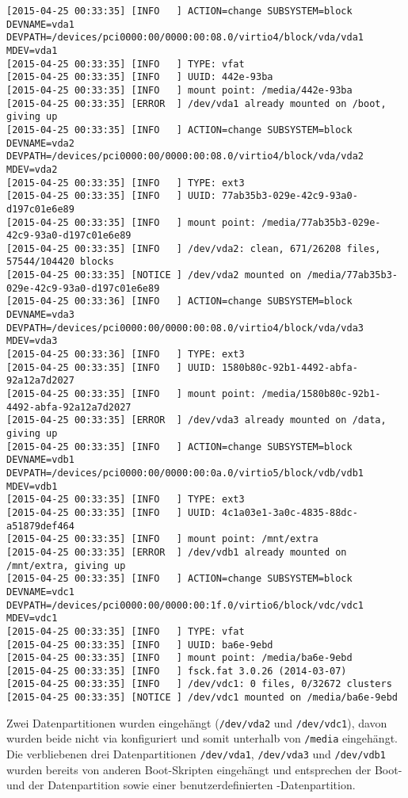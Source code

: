\begin{tiny}
\begin{verbatim}
[2015-04-25 00:33:35] [INFO   ] ACTION=change SUBSYSTEM=block DEVNAME=vda1 DEVPATH=/devices/pci0000:00/0000:00:08.0/virtio4/block/vda/vda1 MDEV=vda1
[2015-04-25 00:33:35] [INFO   ] TYPE: vfat
[2015-04-25 00:33:35] [INFO   ] UUID: 442e-93ba
[2015-04-25 00:33:35] [INFO   ] mount point: /media/442e-93ba
[2015-04-25 00:33:35] [ERROR  ] /dev/vda1 already mounted on /boot, giving up
[2015-04-25 00:33:35] [INFO   ] ACTION=change SUBSYSTEM=block DEVNAME=vda2 DEVPATH=/devices/pci0000:00/0000:00:08.0/virtio4/block/vda/vda2 MDEV=vda2
[2015-04-25 00:33:35] [INFO   ] TYPE: ext3
[2015-04-25 00:33:35] [INFO   ] UUID: 77ab35b3-029e-42c9-93a0-d197c01e6e89
[2015-04-25 00:33:35] [INFO   ] mount point: /media/77ab35b3-029e-42c9-93a0-d197c01e6e89
[2015-04-25 00:33:35] [INFO   ] /dev/vda2: clean, 671/26208 files, 57544/104420 blocks
[2015-04-25 00:33:35] [NOTICE ] /dev/vda2 mounted on /media/77ab35b3-029e-42c9-93a0-d197c01e6e89
[2015-04-25 00:33:36] [INFO   ] ACTION=change SUBSYSTEM=block DEVNAME=vda3 DEVPATH=/devices/pci0000:00/0000:00:08.0/virtio4/block/vda/vda3 MDEV=vda3
[2015-04-25 00:33:36] [INFO   ] TYPE: ext3
[2015-04-25 00:33:35] [INFO   ] UUID: 1580b80c-92b1-4492-abfa-92a12a7d2027
[2015-04-25 00:33:35] [INFO   ] mount point: /media/1580b80c-92b1-4492-abfa-92a12a7d2027
[2015-04-25 00:33:35] [ERROR  ] /dev/vda3 already mounted on /data, giving up
[2015-04-25 00:33:35] [INFO   ] ACTION=change SUBSYSTEM=block DEVNAME=vdb1 DEVPATH=/devices/pci0000:00/0000:00:0a.0/virtio5/block/vdb/vdb1 MDEV=vdb1
[2015-04-25 00:33:35] [INFO   ] TYPE: ext3
[2015-04-25 00:33:35] [INFO   ] UUID: 4c1a03e1-3a0c-4835-88dc-a51879def464
[2015-04-25 00:33:35] [INFO   ] mount point: /mnt/extra
[2015-04-25 00:33:35] [ERROR  ] /dev/vdb1 already mounted on /mnt/extra, giving up
[2015-04-25 00:33:35] [INFO   ] ACTION=change SUBSYSTEM=block DEVNAME=vdc1 DEVPATH=/devices/pci0000:00/0000:00:1f.0/virtio6/block/vdc/vdc1 MDEV=vdc1
[2015-04-25 00:33:35] [INFO   ] TYPE: vfat
[2015-04-25 00:33:35] [INFO   ] UUID: ba6e-9ebd
[2015-04-25 00:33:35] [INFO   ] mount point: /media/ba6e-9ebd
[2015-04-25 00:33:35] [INFO   ] fsck.fat 3.0.26 (2014-03-07)
[2015-04-25 00:33:35] [INFO   ] /dev/vdc1: 0 files, 0/32672 clusters
[2015-04-25 00:33:35] [NOTICE ] /dev/vdc1 mounted on /media/ba6e-9ebd
\end{verbatim}
\end{tiny}

    Zwei Datenpartitionen wurden eingehängt (\texttt{/dev/vda2} und
    \texttt{/dev/vdc1}), davon wurden beide nicht via 
    konfiguriert und somit unterhalb von \texttt{/media} eingehängt. Die
    verbliebenen drei Datenpartitionen \texttt{/dev/vda1}, \texttt{/dev/vda3}
    und \texttt{/dev/vdb1} wurden bereits von anderen Boot-Skripten eingehängt
    und entsprechen der Boot- und der Datenpartition sowie einer
    benutzerdefinierten -Datenpartition.

